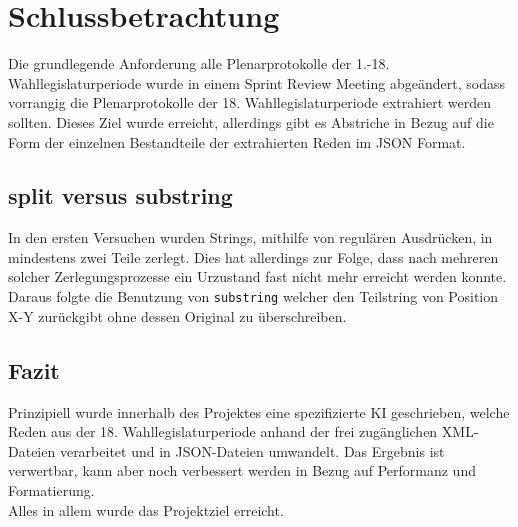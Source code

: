 \chapter{Schlussbetrachtung}
Die grundlegende Anforderung alle Plenarprotokolle der 1.-18. Wahllegislaturperiode wurde in einem Sprint Review Meeting abgeändert, sodass vorrangig die Plenarprotokolle der 18. Wahllegislaturperiode extrahiert werden sollten.
Dieses Ziel wurde erreicht, allerdings gibt es Abstriche in Bezug auf die Form der einzelnen Bestandteile der extrahierten Reden im JSON Format.\\

\section{split versus substring}
In den ersten Versuchen wurden Strings, mithilfe von regulären Ausdrücken, in mindestens zwei Teile zerlegt. Dies hat allerdings zur Folge, dass nach mehreren solcher Zerlegungsprozesse ein Urzustand fast nicht mehr erreicht werden konnte. Daraus folgte die Benutzung von \lstinline|substring| welcher den Teilstring von Position X-Y zurückgibt ohne dessen Original zu überschreiben.

\section{Fazit}
Prinzipiell wurde innerhalb des Projektes eine spezifizierte KI geschrieben, welche Reden aus der 18. Wahllegislaturperiode anhand der frei zugänglichen XML-Dateien\cite{protokolle} verarbeitet und in JSON-Dateien umwandelt. Das Ergebnis ist verwertbar, kann aber noch verbessert werden in Bezug auf Performanz und Formatierung.\\
Alles in allem wurde das Projektziel erreicht.